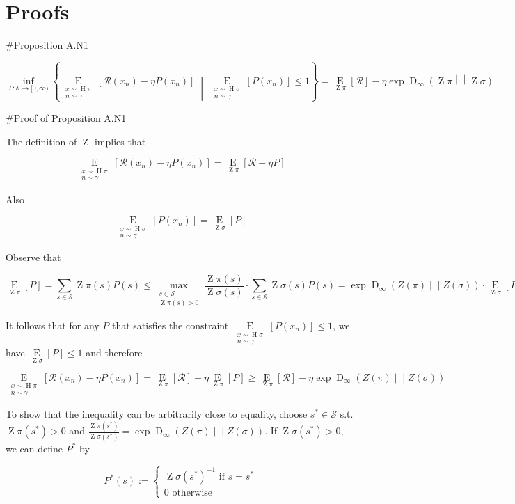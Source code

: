 \documentclass[a4paper]{article}
\newcommand{\AP}[1]{\left(#1\right)}
\newcommand{\AB}[1]{\left[#1\right]}
\newcommand{\ACM}[2]{\left\{#1\;\middle\vert\;#2\right\}}
\newcommand{\Ea}[2]{\underset{#1}{\operatorname{E}}\AB{#2}}
\newcommand{\RD}[3]{\operatorname{D}_{#1}\AP{#2\middle\vert\middle\vert#3}}
\newcommand{\St}{\mathcal{S}}
\newcommand{\R}{\mathcal{R}}
\newcommand{\Pe}{P}
\DeclareMathOperator{\Hi}{H}
\DeclareMathOperator{\Z}{Z}
\begin{document}
\section{Proofs}

\#Proposition A.N1

$$\inf_{\Pe:\St\rightarrow[0,\infty)}\ACM{\Ea{\substack{x\sim\Hi{\pi}\\n\sim\gamma}}{\R\AP{x_n}-\eta\Pe\AP{x_n}}}{\Ea{\substack{x\sim\Hi{\sigma}\\n\sim\gamma}}{\Pe\AP{x_n}}\leq1}=\Ea{\Z{\pi}}{\R}-\eta \exp{\RD{\infty}{\Z{\pi}}{\Z{\sigma}}}$$

\#Proof of Proposition A.N1

The definition of $\Z$ implies that

$$\Ea{\substack{x\sim\Hi{\pi}\\n\sim\gamma}}{\R\AP{x_n}-\eta\Pe\AP{x_n}}=\Ea{\Z{\pi}}{\R-\eta P}$$

Also

$$\Ea{\substack{x\sim\Hi{\sigma}\\n\sim\gamma}}{\Pe\AP{x_n}}=\Ea{\Z{\sigma}}{P}$$

Observe that

$$\Ea{\Z{\pi}}{P} = \sum_{s\in\St}\Z{\pi}(s)P(s) \leq \max_{\substack{s \in \St \\ \Z{\pi}(s) > 0}}\frac{\Z{\pi}(s)}{\Z{\sigma}(s)}\cdot\sum_{s\in\St}\Z{\sigma}(s)P(s) = \exp{\RD{\infty}{Z(\pi)}{Z(\sigma)}} \cdot \Ea{\Z{\sigma}}{P}$$

It follows that for any $P$ that satisfies the constraint $\Ea{\substack{x\sim\Hi{\sigma}\\n\sim\gamma}}{\Pe\AP{x_n}} \leq 1$, we have $\Ea{\Z{\sigma}}{\Pe} \leq 1$ and therefore

$$\Ea{\substack{x\sim\Hi{\pi}\\n\sim\gamma}}{\R\AP{x_n}-\eta\Pe\AP{x_n}} = \Ea{\Z{\pi}}{\R} - \eta \Ea{\Z{\pi}}{\Pe} \geq \Ea{\Z{\pi}}{\R} - \eta\exp{\RD{\infty}{Z(\pi)}{Z(\sigma)}}$$

To show that the inequality can be arbitrarily close to equality, choose $s^* \in \St$ s.t. $\Z{\pi}(s^*) > 0$ and $\frac{\Z{\pi}\AP{s^*}}{\Z{\sigma}\AP{s^*}} = \exp{\RD{\infty}{Z(\pi)}{Z(\sigma)}}$. If $\Z{\sigma}\AP{s^*} > 0$, we can define $\Pe^*$ by

$$\Pe^*(s):=\begin{cases} \Z{\sigma}(s^*)^{-1} \text{ if } s=s^* \\ 0 \text{ otherwise} \end{cases}$$
\end{document}
